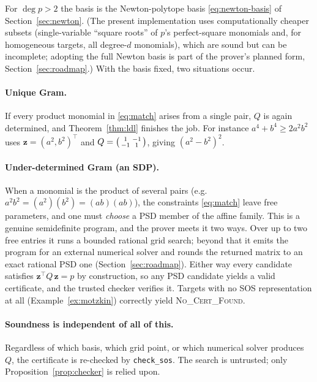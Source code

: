 \documentclass[11pt]{article}
\theoremstyle{definition}
\theoremstyle{plain}
\newcommand{\z}{\mathbf{z}}
\newcommand{\transpose}{^{\!\top}}
\begin{document}
For $\deg p > 2$ the basis is the Newton-polytope basis \eqref{eq:newton-basis}
of Section~\ref{sec:newton}. (The present implementation uses computationally
cheaper subsets (single-variable ``square roots'' of $p$'s perfect-square
monomials and, for homogeneous targets, all degree-$d$ monomials), which are
sound but can be incomplete; adopting the full Newton basis is part of the
prover's planned form, Section~\ref{sec:roadmap}.) With the basis fixed, two
situations occur.

\paragraph{Unique Gram.} If every product monomial in \eqref{eq:match} arises
from a single pair, $Q$ is again determined, and Theorem~\ref{thm:ldl} finishes
the job. For instance $a^4 + b^4 \ge 2a^2b^2$ uses $\z = (a^2, b^2)\transpose$
and $Q = \begin{psmallmatrix} 1 & -1 \\ -1 & 1\end{psmallmatrix}$, giving
$(a^2 - b^2)^2$.

\paragraph{Under-determined Gram (an SDP).} When a monomial is the product of
several pairs (e.g.\ $a^2 b^2 = (a^2)(b^2) = (ab)(ab)$), the constraints
\eqref{eq:match} leave free parameters, and one must \emph{choose} a PSD member
of the affine family. This is a genuine semidefinite program, and the prover
meets it two ways. Over up to two free entries it runs a bounded rational grid
search; beyond that it emits the program for an external numerical solver and
rounds the returned matrix to an exact rational PSD one
(Section~\ref{sec:roadmap}). Either way every candidate satisfies
$\z\transpose Q\,\z = p$ by construction, so any PSD candidate yields a valid
certificate, and the trusted checker verifies it. Targets with no SOS
representation at all (Example~\ref{ex:motzkin}) correctly yield
\textsc{No\_Cert\_Found}.

\paragraph{Soundness is independent of all of this.} Regardless of which basis,
which grid point, or which numerical solver produces $Q$, the certificate is
re-checked by \texttt{check\_sos}. The search is untrusted; only
Proposition~\ref{prop:checker} is relied upon.
\end{document}
